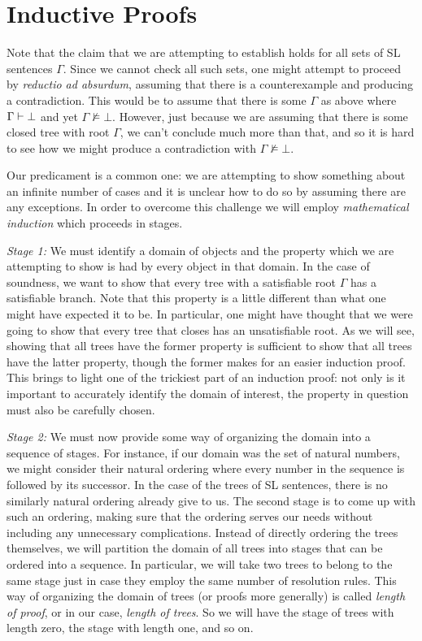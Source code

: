 \section{Inductive Proofs}

Note that the claim that we are attempting to establish holds for all sets of SL sentences $\Gamma$.
Since we cannot check all such sets, one might attempt to proceed by \textit{reductio ad absurdum}, assuming that there is a counterexample and producing a contradiction.
This would be to assume that there is some $\Gamma$ as above where $\Gamma \vdash \bot$ and yet $\Gamma \nvDash \bot$.
However, just because we are assuming that there is some closed tree with root $\Gamma$, we can't conclude much more than that, and so it is hard to see how we might produce a contradiction with $\Gamma \nvDash \bot$.

Our predicament is a common one: we are attempting to show something about an infinite number of cases and it is unclear how to do so by assuming there are any exceptions.
In order to overcome this challenge we will employ \emph{mathematical induction} which proceeds in stages.

\textit{Stage 1:} 
We must identify a domain of objects and the property which we are attempting to show is had by every object in that domain.
In the case of soundness, we want to show that every tree with a satisfiable root $\Gamma$ has a satisfiable branch.
Note that this property is a little different than what one might have expected it to be.
In particular, one might have thought that we were going to show that every tree that closes has an unsatisfiable root.
As we will see, showing that all trees have the former property is sufficient to show that all trees have the latter property, though the former makes for an easier induction proof.
This brings to light one of the trickiest part of an induction proof: not only is it important to accurately identify the domain of interest, the property in question must also be carefully chosen.

\textit{Stage 2:} 
We must now provide some way of organizing the domain into a sequence of stages.
For instance, if our domain was the set of natural numbers, we might consider their natural ordering where every number in the sequence is followed by its successor.
In the case of the trees of SL sentences, there is no similarly natural ordering already give to us.
The second stage is to come up with such an ordering, making sure that the ordering serves our needs without including any unnecessary complications.
Instead of directly ordering the trees themselves, we will partition the domain of all trees into stages that can be ordered into a sequence.
In particular, we will take two trees to belong to the same stage just in case they employ the same number of resolution rules.
This way of organizing the domain of trees (or proofs more generally) is called \textit{length of proof}, or in our case, \textit{length of trees}.
So we will have the stage of trees with length zero, the stage with length one, and so on.

